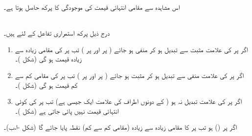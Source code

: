 اس مشاہدہ سے مقامی انتہائی قیمت کی موجودگی کا  پرکھ  حاصل ہوتا ہے۔

\\
درج ذیل پرکھ استمراری تفاعل  کے لئے ہیں۔

\begin{enumerate}
\item
اگر  پر  کی علامت مثبت سے تبدیل ہو کر منفی ہو جائے ( پر  اور  پر ) تب  پر  کی مقامی زیادہ سے زیادہ  قیمت ہو گی (شکل )۔ 
\item
اگر  پر  کی علامت منفی سے تبدیل ہو کر مثبت ہو جائے ( پر  اور  پر ) تب  پر  کی مقامی کم سے کم  قیمت ہو گی (شکل )۔ 
\item
اگر  پر  کی علامت تبدیل نہ ہو ( کے دونوں اطراف  کی علامت ایک جیسی ہے) تب  پر  کی کوئی انتہائی قیمت نہیں پائی جاتی ہے (شکل )۔
\end{enumerate}

اگر  پر  () ہو تب  پر  کا مقامی زیادہ سے زیادہ (مقامی کم سے کم) نقطہ پایا جائے گا (شکل -ا،ب)۔ 



